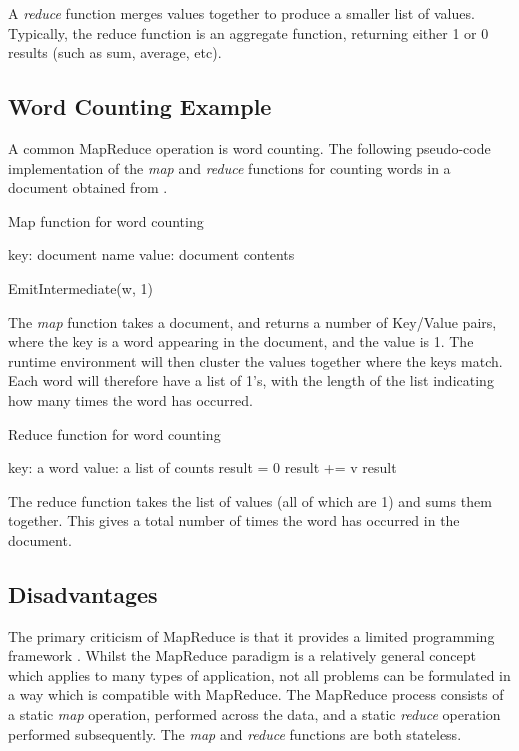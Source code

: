 A \textit{reduce} function merges values together to produce a smaller list of values. Typically, the reduce function is an aggregate function, returning either 1 or 0 results (such as sum, average, etc). 

\subsection{Word Counting Example}
A common MapReduce operation is word counting. The following pseudo-code implementation of the \textit{map} and \textit{reduce} functions for counting words in a document obtained from \cite{dean2004mapreduce}.

\begin{algorithm}
\caption{Map function for word counting}
	\begin{algorithmic}
		\REQUIRE key: document name
		\REQUIRE value: document contents

			\STATE EmitIntermediate(w, 1)
		\ENDFOR
	\end{algorithmic}
\end{algorithm}

The \textit{map} function takes a document, and returns a number of Key/Value pairs, where the key is a word appearing in the document, and the value is 1. The runtime environment will then cluster the values together where the keys match. Each word will therefore have a list of 1's, with the length of the list indicating how many times the word has occurred.

\begin{algorithm}[H]
\caption{Reduce function for word counting}
	\begin{algorithmic}
		\REQUIRE key: a word
		\REQUIRE value: a list of counts
		\STATE result = 0
		\FORALL {v in values}
			\STATE result += v
		\ENDFOR
		\RETURN result
	\end{algorithmic}
\end{algorithm}

The reduce function takes the list of values (all of which are 1) and sums them together. This gives a total number of times the word has occurred in the document.

\subsection{Disadvantages}
The primary criticism of MapReduce is that it provides a limited programming framework \cite{zaharia2010spark}. Whilst the MapReduce paradigm is a relatively general concept which applies to many types of application, not all problems can be formulated in a way which is compatible with MapReduce. The MapReduce process consists of a static \textit{map} operation, performed across the data, and a static \textit{reduce} operation performed subsequently. The \textit{map} and \textit{reduce} functions are both stateless. 

